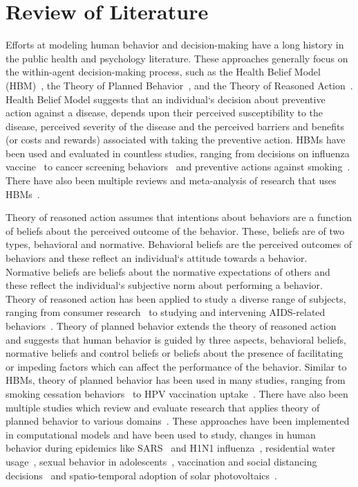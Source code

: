 \documentclass[doublespace]{VTthesis}
\begin{document}
	\chapter{Review of Literature} \label{ch:lit_review}
	Efforts at modeling human behavior and decision-making have a long history in the public health and psychology literature. These approaches generally focus on the within-agent decision-making process, such as the Health Belief Model (HBM)~\cite{rosenstock66hbm}, the Theory of Planned Behavior~\cite{ajzen91tpb}, and the Theory of Reasoned Action~\cite{ajzen80understanding}. Health Belief Model suggests that an individual`s decision about preventive action against a disease, depends upon their perceived susceptibility to the disease, perceived severity of the disease and the perceived barriers and benefits (or costs and rewards) associated with taking the preventive action. HBMs have been used and evaluated in countless studies, ranging from decisions on influenza vaccine~\cite{nexoe1999decision,coe2012use,chen2011using} to cancer screening behaviors~\cite{austin2002breast} and preventive actions against smoking~\cite{sharifirad2007effect}. There have also been multiple reviews and meta-analysis of research that uses HBMs~\cite{janz1984health, harrison1992meta, mikhail1981health, daddario2007review}.
	
	Theory of reasoned action assumes that intentions about behaviors are a function of beliefs about the perceived outcome of the behavior. These, beliefs are of two types, behavioral and normative. Behavioral beliefs are the perceived outcomes of behaviors and these reflect an individual`s attitude towards a behavior. Normative beliefs are beliefs about the normative expectations of others and these reflect the individual`s subjective norm about performing a behavior. Theory of reasoned action has been applied to study a diverse range of subjects, ranging from consumer research~\cite{shimp1984theory} to studying and intervening AIDS-related behaviors~\cite{fishbein1989using}.	Theory of planned behavior extends the theory of reasoned action and suggests that human behavior is guided by three aspects, behavioral beliefs, normative beliefs and control beliefs or beliefs about the presence of facilitating or impeding factors which can affect the performance of the behavior. Similar to HBMs, theory of planned behavior has been used in many studies, ranging from smoking cessation behaviors~\cite{norman1999theory} to HPV vaccination uptake~\cite{gerend2012predicting}. There have also been multiple studies which review and evaluate research that applies theory of planned behavior to various domains~\cite{godin1996theory, conner1998extending}. These approaches have been implemented in computational models and have been used to study, changes in human behavior during epidemics like SARS~\cite{durham2011incorporating} and H1N1 influenza~\cite{Durham2012H1N1}, residential water usage~\cite{linkola2013agent}, sexual behavior in adolescents~\cite{orr13health}, vaccination and social distancing decisions~\cite{karimi2015effect} and spatio-temporal adoption of solar photovoltaics~\cite{robinson2013gis}.
	
\end{document}
